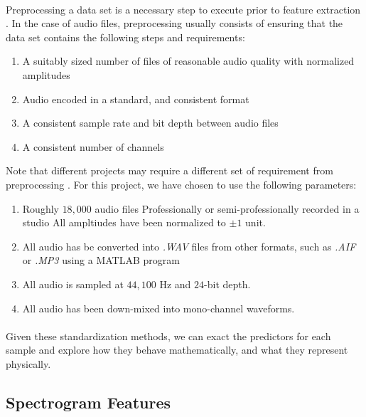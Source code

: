 \documentclass[12pt,letterpaper]{article}
\begin{document}
\paragraph*{}Preprocessing a data set is a necessary step to execute prior to feature extraction \cite{Geron2,James,Serizel}. In the case of audio files, preprocessing usually consists of ensuring that the data set contains the following steps and requirements:
\begin{enumerate}
\item A suitably sized number of files of reasonable audio quality with normalized amplitudes
\item Audio encoded in a standard, and consistent format
\item A consistent sample rate and bit depth between audio files
\item A consistent number of channels
\end{enumerate}
Note that different projects may require a different set of requirement from preprocessing \cite{Virtanen}. For this project, we have chosen to use the following parameters:
\begin{enumerate}
\item Roughly $18,000$ audio files Professionally or semi-professionally recorded in a studio \cite{Philharmonia,UnivIowa} All ampltiudes have been normalized to $\pm 1$ unit.
\item All audio has be converted into \textit{.WAV} files from other formats, such as \textit{.AIF} or \textit{.MP3} using a MATLAB program
\item All audio is sampled at $44,100$ Hz and $24$-bit depth.
\item All audio has been down-mixed into mono-channel waveforms.
\end{enumerate}

\paragraph*{}Given these standardization methods, we can exact the predictors for each sample and explore how they behave mathematically, and what they represent physically.


\newpage

\subsection{Spectrogram Features}
\label{subsec-Spectrogram}
\end{document}
